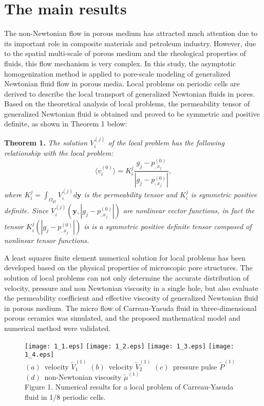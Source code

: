 \documentclass[12pt]{llncs}
\begin{document}
\section{The main results}


The non-Newtonian flow in porous medium has attracted much attention due to its important role in composite materials and petroleum industry.
However, due to the spatial multi-scale of porous medium and the rheological properties of fluids, this flow mechanism is very complex.
In this study, the asymptotic homogenization method is applied to pore-scale modeling of generalized Newtonian fluid flow in porous media.
Local problems on periodic cells are derived to describe the local transport of generalized Newtonian fluids in pores.
Based on the theoretical analysis of local problems, the permeability tensor of generalized Newtonian fluid is obtained and proved to be symmetric and positive definite, as shown in Theorem 1 below:

\textbf{Theorem 1.}
\textsl{The solution $V_{i}^{(j)}$ of the local problem has the following
relationship with the local problem:
\begin{equation*}
\displaystyle \langle v_{i}^{(0)}\rangle = K_{i}^{j}
\frac{g_{j}-p_{,x_{j}}^{(0)}}{|g_{j}-p_{,x_{j}}^{(0)}|},
\end{equation*}
where $K_{i}^{j}=\int_{\Omega_{yf}}V_{i}^{(j)}d\mathbf{y}$ is the permeability tensor
and $K_{i}^{j}$ is symmetric positive definite.
Since $V_{i}^{(j)}(\mathbf{y},|g_{j}-p^{(0)}_{,x_{j}}|)$ are nonlinear vector functions,
in fact the tensor $K_{i}^{j}(|g_{j}-p^{(0)}_{,x_{j}}|)$ is is
a symmetric positive definite tensor composed of nonlinear tensor functions.}

A least squares finite element numerical solution for local problems has been developed based on the physical properties of microscopic pore structures.
The solution of local problems can not only determine the accurate distribution of velocity, pressure and non Newtonian viscosity in a single hole, but also evaluate the permeability coefficient and effective viscosity of generalized Newtonian fluid in porous medium.
The micro flow of Carreau-Yasuda fluid in three-dimensional porous ceramics was simulated, and the proposed mathematical model and numerical method were validated.
\begin{figure}[htp]
\centering
\texttt{[image: 1\_1.eps]}
\texttt{[image: 1\_2.eps]}
\texttt{[image: 1\_3.eps]}
\texttt{[image: 1\_4.eps]}\\
$(a)$\ velocity $\tilde{V}_{1}^{(1)}$\quad
$(b)$\ velocity $\tilde{V}_{2}^{(1)}$\quad
$(c)$\ pressure pulse $\tilde{P}^{(1)}$\quad
$(d)$\ non-Newtonian viscosity $\tilde{\mu}^{(1)}$\\
\small{Figure 1. Numerical results for a local problem of Carreau-Yasuda fluid in 1/8 periodic cells.}
\end{figure}
\end{document}
